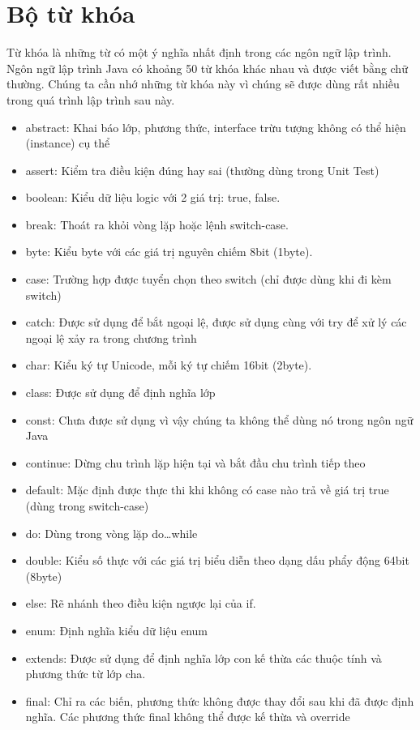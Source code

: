\section{Bộ từ khóa}
\indent Từ khóa là những từ có một ý nghĩa nhất định trong các ngôn ngữ lập trình. Ngôn ngữ lập trình Java có khoảng 50 từ khóa khác nhau và được viết bằng chữ thường. Chúng ta cần nhớ những từ khóa này vì chúng sẽ được dùng rất nhiều trong quá trình lập trình sau này.
\begin{itemize}

\item
abstract: Khai báo lớp, phương thức, interface trừu tượng không có thể hiện (instance) cụ thể 
\item
assert: Kiểm tra điều kiện đúng hay sai (thường dùng trong Unit Test) 
\item
boolean: Kiểu dữ liệu logic với 2 giá trị:  true, false. 
\item
break: Thoát ra khỏi vòng lặp hoặc lệnh switch-case. 
\item
byte: Kiểu byte với các giá trị nguyên chiếm 8bit (1byte). 
\item
case: Trường hợp được tuyển chọn theo switch (chỉ được dùng khi đi kèm switch) 
\item
catch: Được sử dụng để bắt ngoại lệ, được sử dụng cùng với try để xử lý các ngoại lệ xảy ra trong chương trình 
\item
char: Kiểu ký tự Unicode, mỗi ký tự chiếm 16bit (2byte). 
\item
class: Được sử dụng để định nghĩa lớp 
\item
const: Chưa được sử dụng vì vậy chúng ta không thể dùng nó trong ngôn ngữ Java 
\item
continue: Dừng chu trình lặp hiện tại và bắt đầu chu trình tiếp theo 
\item
default: Mặc định được thực thi khi không có case nào trả về giá trị true (dùng trong switch-case) 
\item
do: Dùng trong vòng lặp do…while 
\item
double: Kiểu số thực với các giá trị biểu diễn theo dạng dấu phẩy động 64bit (8byte) 
\item
else: Rẽ nhánh theo điều kiện ngược lại của if. 
\item
enum: Định nghĩa kiểu dữ liệu enum 
\item
extends: Được sử dụng để định nghĩa lớp con kế thừa các thuộc tính và phương thức từ lớp cha. 
\item
final: Chỉ ra các biến, phương thức không được thay đổi sau khi đã được định nghĩa. Các phương thức final không thể được kế thừa và override 

\end{itemize}
